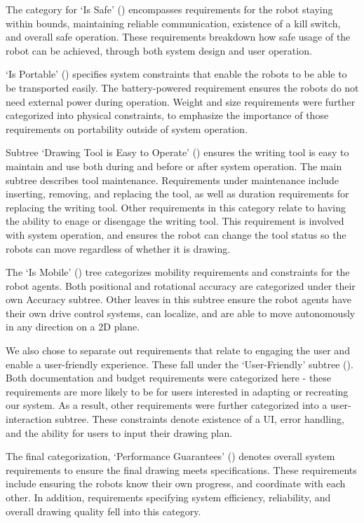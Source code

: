 The category for `Is Safe' () encompasses requirements for the robot staying within bounds, maintaining reliable communication, existence of a kill switch, and overall safe operation. These requirements breakdown how safe usage of the robot can be achieved, through both system design and user operation.

`Is Portable' () specifies system constraints that enable the robots to be able to be transported easily. The battery-powered requirement ensures the robots do not need external power during operation. Weight and size requirements were further categorized into physical constraints, to emphasize the importance of those requirements on portability outside of system operation.

Subtree `Drawing Tool is Easy to Operate' () ensures the writing tool is easy to maintain and use both during and before or after system operation. The main subtree describes tool maintenance. Requirements under maintenance include inserting, removing, and replacing the tool, as well as duration requirements for replacing the writing tool. Other requirements in this category relate to having the ability to enage or disengage the writing tool. This requirement is involved with system operation, and ensures the robot can change the tool status so the robots can move regardless of whether it is drawing.

The `Is Mobile' () tree categorizes mobility requirements and constraints for the robot agents. Both positional and rotational accuracy are categorized under their own Accuracy subtree. Other leaves in this subtree ensure the robot agents have their own drive control systems, can localize, and are able to move autonomously in any direction on a 2D plane.

We also chose to separate out requirements that relate to engaging the user and  enable a user-friendly experience. These fall under the `User-Friendly' subtree (). Both documentation and budget requirements were categorized here - these requirements are more likely to be for users interested in adapting or recreating our system. As a result, other requirements were further categorized into a user-interaction subtree. These constraints denote existence of a UI, error handling, and the ability for users to input their drawing plan.

The final categorization, `Performance Guarantees' () denotes overall system requirements to ensure the final drawing meets specifications. These requirements include ensuring the robots know their own progress, and coordinate with each other. In addition, requirements specifying system efficiency, reliability, and overall drawing quality fell into this category.

